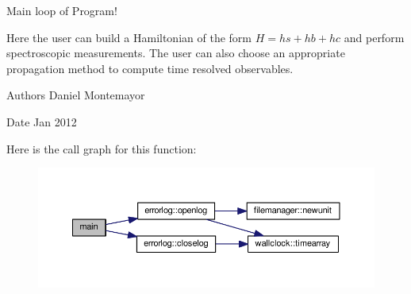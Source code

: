 Main loop of Program! 

Here the user can build a Hamiltonian of the form $H=hs+hb+hc$ and perform spectroscopic measurements. The user can also choose an appropriate propagation method to compute time resolved observables. \begin{DoxyAuthor}{Authors}
Daniel Montemayor
\end{DoxyAuthor}
\begin{DoxyDate}{Date}
Jan 2012 
\end{DoxyDate}


Here is the call graph for this function\+:\nopagebreak
\begin{figure}[H]
\begin{center}
\leavevmode
\includegraphics[width=350pt]{src_2system__driver_8f90_a8ec2266d83cd6c0b762cbcbc92c0af3d_cgraph}
\end{center}
\end{figure}


